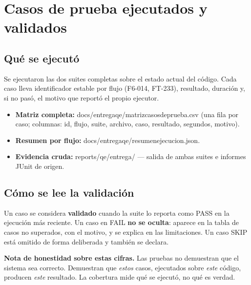 \documentclass[11pt,a4paper]{article}
\newcommand{\code}[1]{{\ttfamily\small\def\_{\textunderscore\allowbreak}#1}}
\begin{document}
\section{Casos de prueba ejecutados y validados}
\label{sec:casos}

\subsection*{Qué se ejecutó}

Se ejecutaron las dos suites completas sobre el estado actual del código. Cada caso lleva
identificador estable por flujo (\code{F6-014}, \code{FT-233}), resultado, duración y, si no
pasó, el motivo que reportó el propio ejecutor.

\begin{itemize}[leftmargin=1.4em,itemsep=1pt]
\item \textbf{Matriz completa:} \code{docs/entrega\_qe/matriz\_casos\_de\_prueba.csv}
      (una fila por caso; columnas: id, flujo, suite, archivo, caso, resultado, segundos, motivo).
\item \textbf{Resumen por flujo:} \code{docs/entrega\_qe/resumen\_ejecucion.json}.
\item \textbf{Evidencia cruda:} \code{reports/qe/entrega/} --- salida de ambas suites e
      informes JUnit de origen.
\end{itemize}

\subsection*{Cómo se lee la validación}

Un caso se considera \textbf{validado} cuando la suite lo reporta como \code{PASS} en la
ejecución más reciente. Un caso en \code{FAIL} \textbf{no se oculta}: aparece en la tabla de
casos no superados, con el motivo, y se explica en las limitaciones. Un caso \code{SKIP} está
omitido de forma deliberada y también se declara.

\begin{finding}
\textbf{Nota de honestidad sobre estas cifras.} Las pruebas no demuestran que el sistema sea
correcto. Demuestran que \emph{estos} casos, ejecutados sobre \emph{este} código, producen
\emph{este} resultado. La cobertura mide qué se ejecutó, no qué es verdad.
\end{finding}

\end{document}
